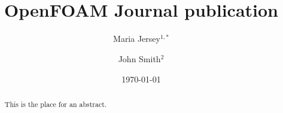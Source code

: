 \documentclass[e-only,10pt,reqno]{ofj}
\newcommand{\OF}[0]{OpenFOAM\textsuperscript{\textregistered} }
\begin{document}


\title[\OF Journal publication]{\OF Journal publication}

\ifdefined\review
  \author{}
  \address{}
  \email{}
\else



\author{Maria Jersey$^{1,*}$}
\address{$^1$Address1}

\author{John Smith$^2$}
\address{$2$Address2} %

\fi



\begin{abstract}
This is the place for an abstract.
\end{abstract}


\date{\today}

\dedicatory{}


\maketitle

\linenumbers

\end{document}
